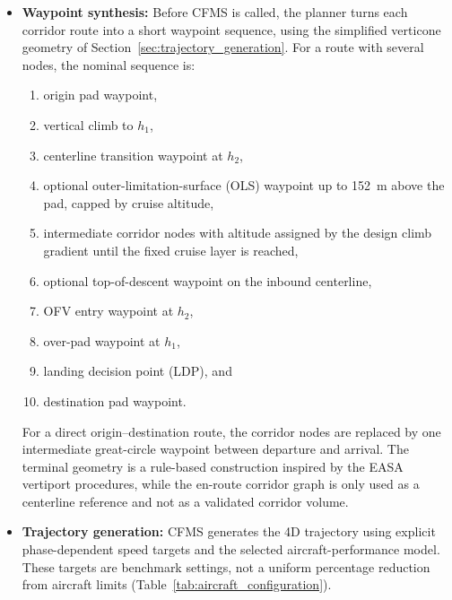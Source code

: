 \begin{itemize}
    \item \textbf{Waypoint synthesis:} Before CFMS is called, the planner turns each corridor route into a short waypoint sequence, using the simplified verticone geometry of Section~\ref{sec:trajectory_generation}. For a route with several nodes, the nominal sequence is:
    \begin{enumerate}
        \item origin pad waypoint,
        \item vertical climb to \(h_1\),
        \item centerline transition waypoint at \(h_2\),
        \item optional outer-limitation-surface (OLS) waypoint up to \SI{152}{m} above the pad, capped by cruise altitude,
        \item intermediate corridor nodes with altitude assigned by the design climb gradient until the fixed cruise layer is reached,
        \item optional top-of-descent waypoint on the inbound centerline,
        \item OFV entry waypoint at \(h_2\),
        \item over-pad waypoint at \(h_1\),
        \item landing decision point (LDP), and
        \item destination pad waypoint.
    \end{enumerate}
    For a direct origin--destination route, the corridor nodes are replaced by one intermediate great-circle waypoint between departure and arrival. The terminal geometry is a rule-based construction inspired by the EASA vertiport procedures, while the en-route corridor graph is only used as a centerline reference and not as a validated corridor volume.

    \item \textbf{Trajectory generation:} CFMS generates the 4D trajectory using explicit phase-dependent speed targets and the selected aircraft-performance model. These targets are benchmark settings, not a uniform percentage reduction from aircraft limits (Table~\ref{tab:aircraft_configuration}).
\end{itemize}

